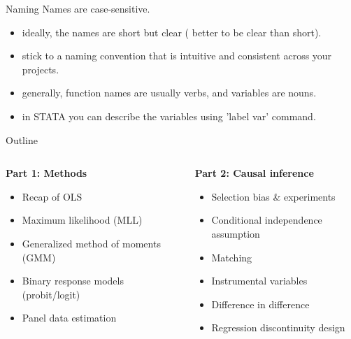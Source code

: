 \documentclass[handout]{beamer}
\begin{document}
\begin{frame}{Naming}
Names are case-sensitive.
\begin{itemize}
	\item ideally, the names are short but clear ( better to be clear than short).
	\item stick to a naming convention that is intuitive and consistent across your projects.
	\item generally, function names are usually verbs, and variables are nouns.
	\item in STATA you can describe the variables using 'label var' command.
\end{itemize}
\end{frame}



\begin{frame}{Outline}
	\begin{columns}
		\begin{column}{.5\textwidth}
			\textbf{Part 1: Methods}
			\begin{itemize}
				\item Recap of OLS
				\item Maximum likelihood (MLL)
				\item Generalized method of moments (GMM)
				\item Binary response models (probit/logit)
				\item Panel data estimation
			\end{itemize}
		\end{column}
		\begin{column}{.5\textwidth}
			\textbf{Part 2: Causal inference}
			\begin{itemize}
				\item Selection bias \& experiments
				\item Conditional independence assumption
				\item Matching
				\item Instrumental variables
				\item Difference in difference
				\item Regression discontinuity design
			\end{itemize}
		\end{column}
	\end{columns}	
\end{frame}
\end{document}

